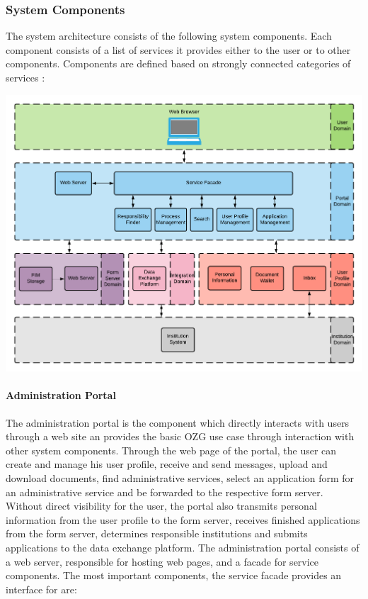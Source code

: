 \subsubsection{System Components}
The system architecture consists of the following system components. Each component consists of a list of services it provides either to the user or to other components. Components are defined based on strongly connected categories of services \cite{NRW:Umsetzung}:

\begin{center}
    \includegraphics[scale=0.6]{Diagrams/OZG System Overview.pdf}
\end{center}

\paragraph{Administration Portal}
The administration portal is the component which directly interacts with users through a web site an provides the basic OZG use case through interaction with other system components. Through the web page of the portal, the user can create and manage his user profile, receive and send messages, upload and download documents, find administrative services, select an application form for an administrative service and be forwarded to the respective form server. Without direct visibility for the user, the portal also transmits personal information from the user profile to the form server, receives finished applications from the form server, determines responsible institutions and submits applications to the data exchange platform.
The administration portal consists of a web server, responsible for hosting web pages, and a facade for service components. The most important components, the service facade provides an interface for are:

